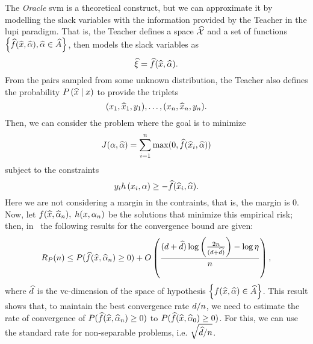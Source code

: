 The \emph{Oracle} \acrshort{svm} is a theoretical construct, but we can approximate it by modelling the slack variables with the information provided by the Teacher in the \acrshort{lupi} paradigm.
That is, the Teacher defines a space $\widehat{\mathcal{X}}$ and a set of functions $\left\{\widehat{f}(\widehat{x}, \widehat{\alpha}) , \widehat{\alpha} \in \widehat{A}\right\}$, then models the slack variables as
\begin{equation}
    \nonumber
    \widehat{\xi} = \widehat{f}(\widehat{x}, \widehat{\alpha}) .
\end{equation}
From the pairs sampled from some unknown distribution, the Teacher also defines the probability $P\left( \widehat{x} \;\middle\vert\; x \right)$ to provide the triplets
\begin{equation}
    \nonumber
    (x_1, \widehat{x}_1, y_1), \ldots, (x_n, \widehat{x}_n, y_n) .
\end{equation}
Then, we can consider the problem where the goal is to minimize
$$ J(\alpha, \widehat{\alpha}) = \sum_{i=1}^n \max(0, \widehat{f}(\widehat{x}_i, \widehat{\alpha})) $$
subject to the constraints
$$ y_i h\left(x_i, \alpha\right) \geq - \widehat{f}(\widehat{x}_i, \widehat{\alpha}).$$
Here we are not considering a margin in the contraints, that is, the margin is $0$.
Now, let $f(\widehat{x}, \widehat{\alpha}_n),\; h(x, \alpha_n)$ be the solutions that minimize this empirical risk; then, in~\citet[Proposition~2]{VapnikV09} the following results for the convergence bound are given:
\begin{equation}
    \label{eq:lupi_bound}
    \exprisk(\nsamples) \leq P(\priv{f}(\priv{x}, \priv{\param}_\nsamples) \geq 0) + \bigO{\frac{(\vc + \priv{\vc}) \log\left(\frac{2\nsamples}{(\vc + \priv{\vc})} \right) - \log\eta}{\nsamples} } ,
\end{equation}
where $\widehat{d}$ is the \acrshort{vc}-dimension of the space of hypothesis $\left\{f(\widehat{x}, \widehat{\alpha}) \in \widehat{A}\right\}$. This result shows that, to maintain the best convergence rate $d/n$, we need to estimate the rate of convergence of $P(\widehat{f}(\widehat{x}, \widehat{\alpha}_n) \geq 0)$ to $P(\widehat{f}(\widehat{x}, \widehat{\alpha}_0) \geq 0)$. For this, we can use the standard rate for non-separable problems, i.e. $\sqrt{\widehat{d}/n}$.
